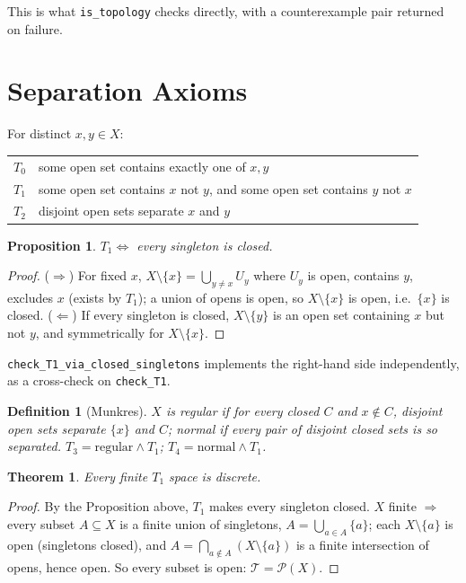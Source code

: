 \documentclass[11pt]{article}
\newtheorem{theorem}{Theorem}
\newtheorem{proposition}{Proposition}
\newtheorem{definition}{Definition}
\begin{document}
This is what \texttt{is\_topology} checks directly, with a counterexample pair returned on
failure.

\section{Separation Axioms}

For distinct $x,y\in X$:

\begin{center}
\begin{tabular}{ll}
$T_0$ & some open set contains exactly one of $x,y$ \\
$T_1$ & some open set contains $x$ not $y$, and some open set contains $y$ not $x$ \\
$T_2$ & disjoint open sets separate $x$ and $y$ \\
\end{tabular}
\end{center}

\begin{proposition}
$T_1 \iff$ every singleton is closed.
\end{proposition}
\begin{proof}
($\Rightarrow$) For fixed $x$, $X\setminus\{x\} = \bigcup_{y\ne x} U_y$ where $U_y$ is open,
contains $y$, excludes $x$ (exists by $T_1$); a union of opens is open, so
$X\setminus\{x\}$ is open, i.e.\ $\{x\}$ is closed.
($\Leftarrow$) If every singleton is closed, $X\setminus\{y\}$ is an open set containing
$x$ but not $y$, and symmetrically for $X\setminus\{x\}$.
\end{proof}

\texttt{check\_T1\_via\_closed\_singletons} implements the right-hand side independently,
as a cross-check on \texttt{check\_T1}.

\begin{definition}[Munkres]
$X$ is \emph{regular} if for every closed $C$ and $x\notin C$, disjoint open sets separate
$\{x\}$ and $C$; \emph{normal} if every pair of disjoint closed sets is so separated.
$T_3 = \text{regular} \wedge T_1$; $T_4 = \text{normal}\wedge T_1$.
\end{definition}

\begin{theorem}
\label{thm:finite-t1-discrete}
Every finite $T_1$ space is discrete.
\end{theorem}
\begin{proof}
By the Proposition above, $T_1$ makes every singleton closed. $X$ finite $\Rightarrow$
every subset $A\subseteq X$ is a finite union of singletons, $A = \bigcup_{a\in A}\{a\}$;
each $X\setminus\{a\}$ is open (singletons closed), and $A = \bigcap_{a\notin A}
(X\setminus\{a\})$ is a finite intersection of opens, hence open. So every subset is open:
$\mathcal T = \mathcal P(X)$.
\end{proof}
\end{document}
